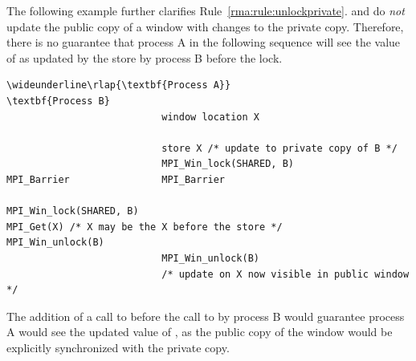 \begin{example}
%
The following example further clarifies  
Rule~\ref{rma:rule:unlockprivate}.   and
 do \emph{not} update the public copy of
a window with changes to the private copy.  Therefore, there is no
guarantee that process A in the
following sequence will see the value of  as updated by the
store by process B before the lock.

\begin{Verbatim}[commandchars=\\\{\}]
\wideunderline\rlap{\textbf{Process A}}                           \textbf{Process B}
                           window location X

                           store X /* update to private copy of B */
                           MPI_Win_lock(SHARED, B)
MPI_Barrier                MPI_Barrier

MPI_Win_lock(SHARED, B)
MPI_Get(X) /* X may be the X before the store */
MPI_Win_unlock(B)
                           MPI_Win_unlock(B)
                           /* update on X now visible in public window */
\end{Verbatim}
\lstset{fancyvrb=false}
The addition of a call to  before the call to
 by process B would guarantee process A would
see the updated value of , as the public copy of the window would be
explicitly synchronized with the private copy.
\end{example}

